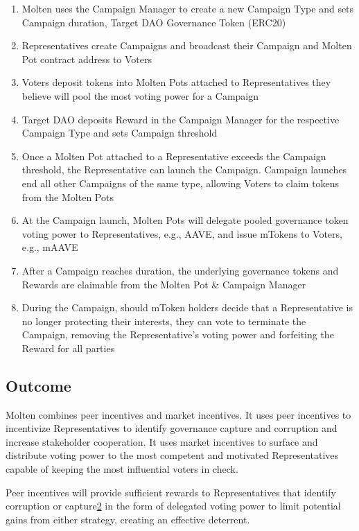 \documentclass[
]{article}
\begin{document}
\begin{enumerate}
\def\labelenumi{\arabic{enumi}.}
\item
  Molten uses the Campaign Manager to create a new Campaign Type and
  sets Campaign duration, Target DAO Governance Token (ERC20)
\item
  Representatives create Campaigns and broadcast their Campaign and
  Molten Pot contract address to Voters
\item
  Voters deposit tokens into Molten Pots attached to Representatives
  they believe will pool the most voting power for a Campaign
\item
  Target DAO deposits Reward in the Campaign Manager for the respective
  Campaign Type and sets Campaign threshold
\item
  Once a Molten Pot attached to a Representative exceeds the Campaign
  threshold, the Representative can launch the Campaign. Campaign
  launches end all other Campaigns of the same type, allowing Voters to
  claim tokens from the Molten Pots
\item
  At the Campaign launch, Molten Pots will delegate pooled governance
  token voting power to Representatives, e.g., AAVE, and issue mTokens
  to Voters, e.g., mAAVE
\item
  After a Campaign reaches duration, the underlying governance tokens
  and Rewards are claimable from the Molten Pot \& Campaign Manager
\item
  During the Campaign, should mToken holders decide that a
  Representative is no longer protecting their interests, they can vote
  to terminate the Campaign, removing the Representative's voting power
  and forfeiting the Reward for all parties
\end{enumerate}

\hypertarget{outcome}{%
\subsection{Outcome}\label{outcome}}

Molten combines peer incentives and market incentives. It uses peer
incentives to incentivize Representatives to identify governance capture
and corruption and increase stakeholder cooperation. It uses market
incentives to surface and distribute voting power to the most competent
and motivated Representatives capable of keeping the most influential
voters in check.

Peer incentives will provide sufficient rewards to Representatives that
identify corruption or
capture\href{https://doi.org/10.1371/journal.pcbi.1004232}{2} in the
form of delegated voting power to limit potential gains from either
strategy, creating an effective deterrent.
\end{document}
